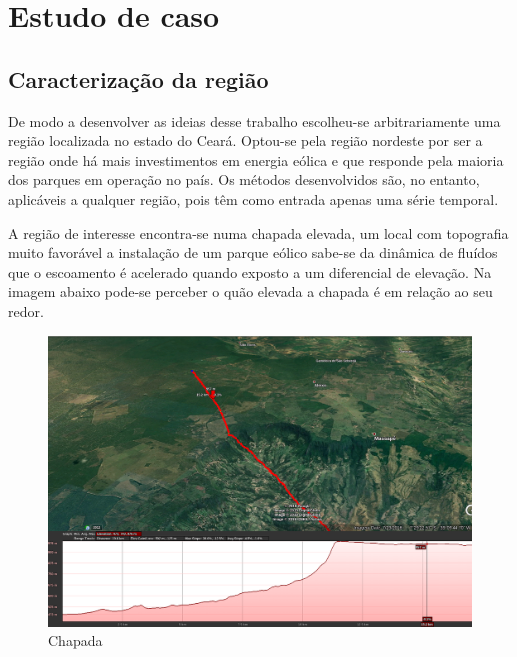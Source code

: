 \documentclass[
	12pt,				%
	openright,			%
	oneside,			%
	a4paper,			%
	english,			%
	french,				%
	spanish,			%
	brazil				%
	]{abntex2}
\begin{document}

\cleardoublepage
\part{Estudo de caso}

\chapter{Caracterização da região}

De modo a desenvolver as ideias desse trabalho escolheu-se arbitrariamente uma região localizada no estado do Ceará. Optou-se pela região nordeste por ser a região onde há mais investimentos em energia eólica e que responde pela maioria dos parques em operação no país. Os métodos desenvolvidos são, no entanto, aplicáveis a qualquer região, pois têm como entrada apenas uma série temporal.

A região de interesse encontra-se numa chapada elevada, um local com topografia muito favorável a instalação de um parque eólico sabe-se da dinâmica de fluídos que o escoamento é acelerado quando exposto a um diferencial de elevação. Na imagem abaixo pode-se perceber o quão elevada a chapada é em relação ao seu redor.

\begin{figure}[h]
    \centering
	\includegraphics[width=\textwidth]{elevation2}
	\caption{Chapada}
\end{figure}
\FloatBarrier
\end{document}
